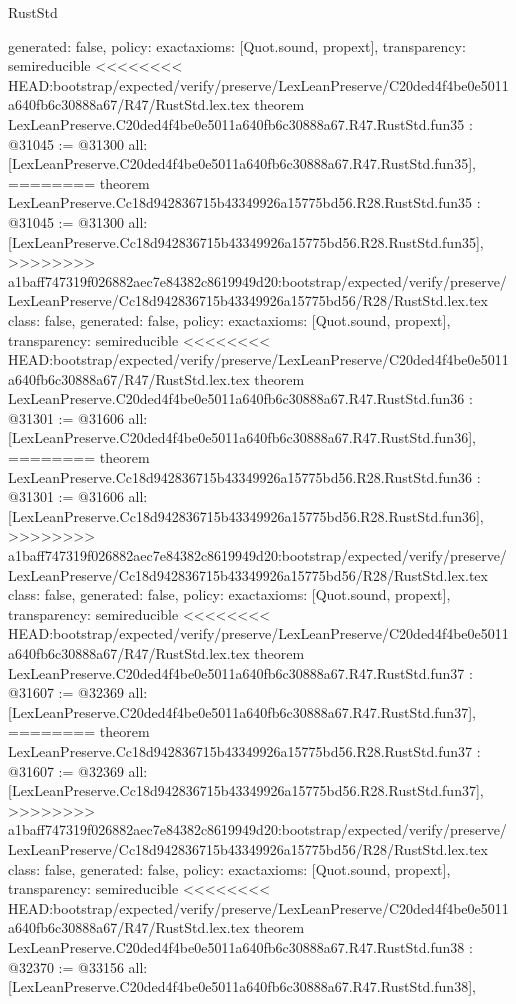 \begin{lexlean}{RustStd}
\begin{coremodule}
{\begin{coremodule}
{{{{{{{{{{{{{{{{{{{{{{{{{{{{{{{{{{{{{{  generated: false,
  policy: exact{axioms: [Quot.sound, propext]},
  transparency: semireducible
}
<<<<<<<< HEAD:bootstrap/expected/verify/preserve/LexLeanPreserve/C20ded4f4be0e5011a640fb6c30888a67/R47/RustStd.lex.tex
theorem LexLeanPreserve.C20ded4f4be0e5011a640fb6c30888a67.R47.RustStd.fun35 : @31045 := @31300 {
  all: [LexLeanPreserve.C20ded4f4be0e5011a640fb6c30888a67.R47.RustStd.fun35],
========
theorem LexLeanPreserve.Cc18d942836715b43349926a15775bd56.R28.RustStd.fun35 : @31045 := @31300 {
  all: [LexLeanPreserve.Cc18d942836715b43349926a15775bd56.R28.RustStd.fun35],
>>>>>>>> a1baff747319f026882aec7e84382c8619949d20:bootstrap/expected/verify/preserve/LexLeanPreserve/Cc18d942836715b43349926a15775bd56/R28/RustStd.lex.tex
  class: false,
  generated: false,
  policy: exact{axioms: [Quot.sound, propext]},
  transparency: semireducible
}
<<<<<<<< HEAD:bootstrap/expected/verify/preserve/LexLeanPreserve/C20ded4f4be0e5011a640fb6c30888a67/R47/RustStd.lex.tex
theorem LexLeanPreserve.C20ded4f4be0e5011a640fb6c30888a67.R47.RustStd.fun36 : @31301 := @31606 {
  all: [LexLeanPreserve.C20ded4f4be0e5011a640fb6c30888a67.R47.RustStd.fun36],
========
theorem LexLeanPreserve.Cc18d942836715b43349926a15775bd56.R28.RustStd.fun36 : @31301 := @31606 {
  all: [LexLeanPreserve.Cc18d942836715b43349926a15775bd56.R28.RustStd.fun36],
>>>>>>>> a1baff747319f026882aec7e84382c8619949d20:bootstrap/expected/verify/preserve/LexLeanPreserve/Cc18d942836715b43349926a15775bd56/R28/RustStd.lex.tex
  class: false,
  generated: false,
  policy: exact{axioms: [Quot.sound, propext]},
  transparency: semireducible
}
<<<<<<<< HEAD:bootstrap/expected/verify/preserve/LexLeanPreserve/C20ded4f4be0e5011a640fb6c30888a67/R47/RustStd.lex.tex
theorem LexLeanPreserve.C20ded4f4be0e5011a640fb6c30888a67.R47.RustStd.fun37 : @31607 := @32369 {
  all: [LexLeanPreserve.C20ded4f4be0e5011a640fb6c30888a67.R47.RustStd.fun37],
========
theorem LexLeanPreserve.Cc18d942836715b43349926a15775bd56.R28.RustStd.fun37 : @31607 := @32369 {
  all: [LexLeanPreserve.Cc18d942836715b43349926a15775bd56.R28.RustStd.fun37],
>>>>>>>> a1baff747319f026882aec7e84382c8619949d20:bootstrap/expected/verify/preserve/LexLeanPreserve/Cc18d942836715b43349926a15775bd56/R28/RustStd.lex.tex
  class: false,
  generated: false,
  policy: exact{axioms: [Quot.sound, propext]},
  transparency: semireducible
}
<<<<<<<< HEAD:bootstrap/expected/verify/preserve/LexLeanPreserve/C20ded4f4be0e5011a640fb6c30888a67/R47/RustStd.lex.tex
theorem LexLeanPreserve.C20ded4f4be0e5011a640fb6c30888a67.R47.RustStd.fun38 : @32370 := @33156 {
  all: [LexLeanPreserve.C20ded4f4be0e5011a640fb6c30888a67.R47.RustStd.fun38],
}}}}}}}}}}}}}}}}}}}}}}}}}}}}}}}}}}}}}}}}}
\end{coremodule}}
\end{coremodule}
\end{lexlean}
